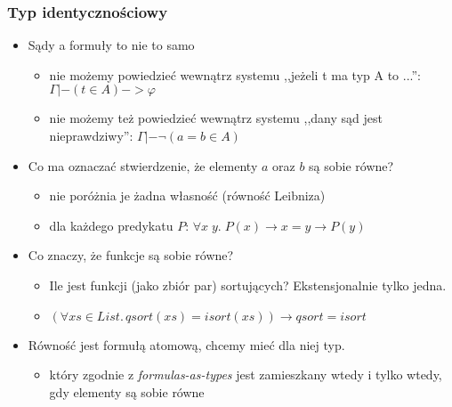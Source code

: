 \documentclass{beamer}
\begin{document}
\begin{frame}
\frametitle{Typ identycznościowy}

\begin{itemize}
\item Sądy a formuły to nie to samo
\begin{itemize}
\item nie możemy powiedzieć wewnątrz systemu ,,jeżeli t ma typ A to ...'': $\Gamma |- (t \in A) -> \varphi$
\item nie możemy też powiedzieć wewnątrz systemu ,,dany sąd jest nieprawdziwy'': $\Gamma |- \neg (a = b \in A)$
\end{itemize}

\item Co ma oznaczać stwierdzenie, że elementy $a$ oraz $b$ są sobie równe?
\begin{itemize}
\item nie poróżnia je żadna własność (równość Leibniza)
\item dla każdego predykatu $P$: $\forall x\; y.\; P(x) \to x=y \to P(y)$
\end{itemize}

\item Co znaczy, że funkcje są sobie równe?
\begin{itemize}
\item Ile jest funkcji (jako zbiór par) sortujących? Ekstensjonalnie tylko jedna.
\item $(\forall xs \in List.\,qsort(xs) = isort(xs)) \to qsort = isort$
\end{itemize}

\item Równość jest formułą atomową, chcemy mieć dla niej typ.
\begin{itemize}
\item który zgodnie z \emph{formulas-as-types} jest zamieszkany wtedy i tylko wtedy, gdy elementy są sobie równe
\end{itemize}

\end{itemize}

\end{frame}

\end{document}
